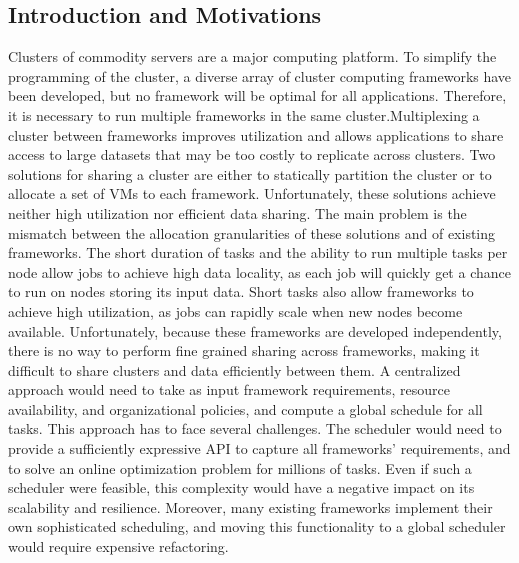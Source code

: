 	\subsection{Introduction and Motivations}
	Clusters of commodity servers are a major
	computing platform. To simplify the programming of the cluster, a diverse array of	cluster computing frameworks have been developed, but no framework will be optimal for all applications. Therefore, it is necessary to run multiple frameworks in the same cluster.\newline Multiplexing a cluster between frameworks improves utilization and	allows applications to share access to large datasets that	may be too costly to replicate across clusters. Two solutions for sharing a cluster are either to statically partition the cluster or to allocate a set of VMs to each
	framework. Unfortunately, these solutions achieve neither
	high utilization nor efficient data sharing. The main
	problem is the mismatch between the allocation granularities
	of these solutions and of existing frameworks.\newline
	\newline
	The short duration of tasks and the ability to run multiple tasks per node allow jobs to achieve high data locality, as each job will quickly get a chance to run on nodes storing its input data. Short	tasks also allow frameworks to achieve high utilization,	as jobs can rapidly scale when new nodes become available.
	Unfortunately, because these frameworks are developed
	independently, there is no way to perform fine grained
	sharing across frameworks, making it difficult to
	share clusters and data efficiently between them.\newline
	\newline
	A centralized approach would need to take as input framework requirements, resource availability, and organizational policies,
	and compute a global schedule for all tasks. This approach has to face several challenges.\newline
	The scheduler would need to provide a sufficiently expressive
	API to capture all frameworks’ requirements, and
	to solve an online optimization problem for millions
	of tasks. Even if such a scheduler were feasible, this
	complexity would have a negative impact on its scalability
	and resilience. Moreover, many existing
	frameworks implement their own sophisticated scheduling, and moving this functionality to a global
	scheduler would require expensive refactoring.\newline
	\newline
